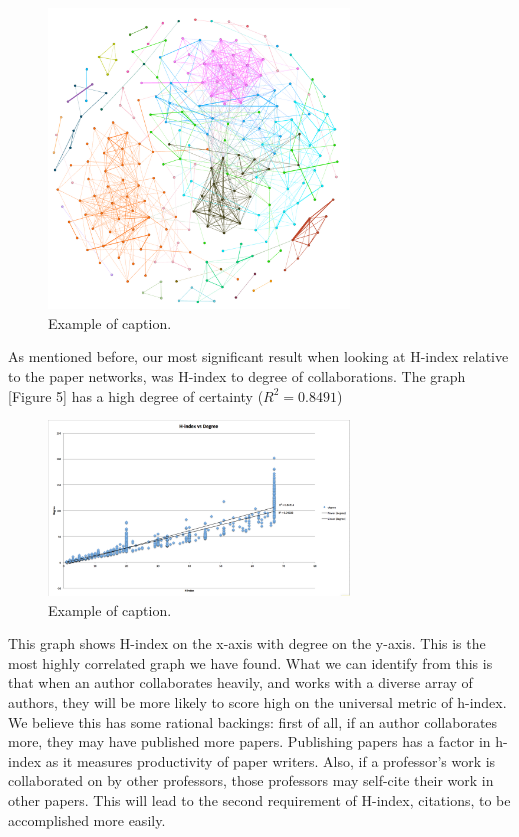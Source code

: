 \documentclass[times, 10pt,twocolumn]{article}
\begin{document}
\begin{figure}[h]
   \includegraphics[width=8cm]{figure4.png}
   \caption{Example of caption.}
\end{figure}

As mentioned before, our most significant result when looking at H-index relative to the paper networks, was H-index to degree of collaborations. The graph [Figure 5] has a high degree of certainty ($R^2 = 0.8491$)  \\

\begin{figure}[h]
   \includegraphics[width=8cm]{figure5.png}
   \caption{Example of caption.}
\end{figure}

This graph shows H-index on the x-axis with degree on the y-axis. This is the most highly correlated graph we have found. What we can identify from this is that when an author collaborates heavily, and works with a diverse array of authors, they will be more likely to score high on the universal metric of h-index. \\

We believe this has some rational backings: first of all, if an author collaborates more, they may have published more papers. Publishing papers has a factor in h-index as it measures productivity of paper writers. Also, if a professor’s work is collaborated on by other professors, those professors may self-cite their work in other papers. This will lead to the second requirement of H-index, citations, to be accomplished more easily. \\
\end{document}
